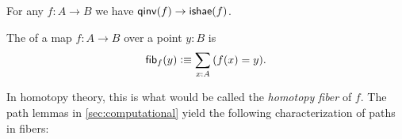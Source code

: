 \documentclass[hott-all.tex]{subfiles}
\begin{document}
\begin{thm}\label{thm:equiv-iso-adj}
  For any $f:A\to B$ we have $\mathsf{qinv}(f)\to\mathsf{ishae}(f)$.
\end{thm}
%
%

\begin{defn}\label{defn:homotopy-fiber}
  The 
  of a map $f:A\to B$ over a point $y:B$ is
  \[ \hfib f y \defeq \sm{x:A} (f(x) = y).\]
\end{defn}

In homotopy theory, this is what would be called the \emph{homotopy fiber} of $f$.
The path lemmas in \cref{sec:computational} yield the following characterization of paths in fibers:
\end{document}
